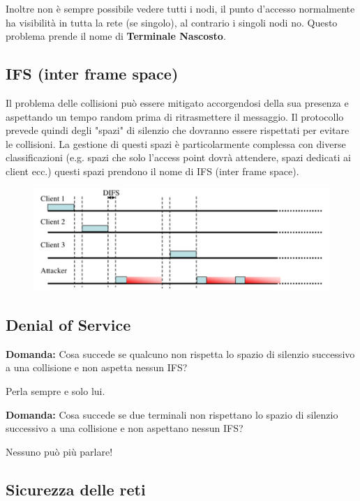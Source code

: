 Inoltre non è sempre possibile vedere tutti i nodi, il punto d'accesso normalmente ha visibilità in tutta la rete (se singolo), al contrario i singoli nodi no. Questo problema prende il nome di \textbf{Terminale Nascosto}.

\subsection{IFS (inter frame space)}

Il problema delle collisioni può essere mitigato accorgendosi della sua presenza e aspettando un tempo random prima di ritrasmettere il messaggio. Il protocollo prevede quindi degli "spazi" di silenzio che dovranno essere rispettati per evitare le collisioni. La gestione di questi spazi è particolarmente complessa con diverse classificazioni (e.g. spazi che solo l'access point dovrà attendere, spazi dedicati ai client ecc.) questi spazi prendono il nome di \textbf{}IFS (inter frame space).
\begin{figure}[h!]
    \centering
    \includegraphics[width=.8\linewidth]{res/IFS.png}
    \caption{}
\end{figure}

\subsection{Denial of Service}
\textbf{Domanda:} Cosa succede se qualcuno non rispetta lo spazio di silenzio successivo a una collisione e non aspetta nessun IFS?

Perla sempre e solo lui.

\textbf{Domanda:} Cosa succede se due terminali non rispettano lo spazio di silenzio successivo a una
collisione e non aspettano nessun IFS?

Nessuno può più parlare!

\subsection{Sicurezza delle reti}

